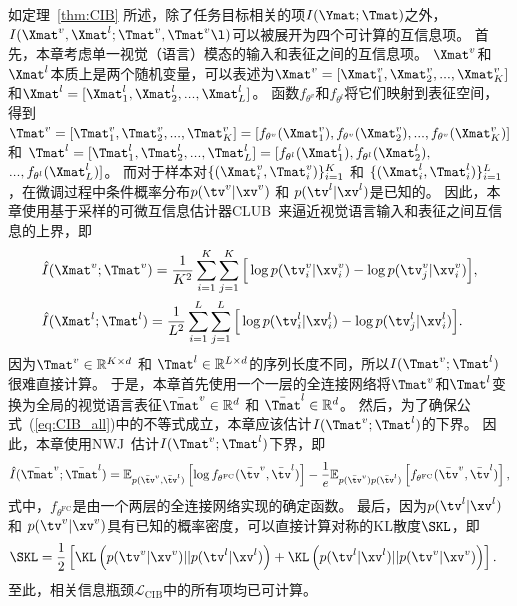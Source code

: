 如定理~\ref{thm:CIB} 所述，除了任务目标相关的项$I(\Ymat; \Tmat)$之外，$I(\Xmat^v, \Xmat^l; \Tmat^v, \Tmat^v\l)$可以被展开为四个可计算的互信息项。
首先，本章考虑单一视觉（语言）模态的输入和表征之间的互信息项。
$\Xmat^v$和$\Xmat^l$本质上是两个随机变量，可以表述为$\Xmat^v = [\Xmat^v_{1}, \Xmat^v_{2}, ..., \Xmat^v_{K}]$和$\Xmat^l = [\Xmat^l_{1}, \Xmat^l_{2}, ..., \Xmat^l_{L}]$。
函数$f_{\theta^v}$和$f_{\theta^l}$将它们映射到表征空间，得到$\Tmat^v = [\Tmat^v_{1}, \Tmat^v_{2}, ..., \Tmat^v_{K}] = [f_{\theta^v}(\Xmat^v_{1}), f_{\theta^v}(\Xmat^v_{2}), ..., f_{\theta^v}(\Xmat^v_{K})]$ 和 $\Tmat^l = [\Tmat^l_{1}, \Tmat^l_{2}, ..., \Tmat^l_{L}] = [f_{\theta^l}(\Xmat^l_{1}), f_{\theta^l}(\Xmat^l_{2}),$ $..., f_{\theta^l}(\Xmat^l_{L})]$。
而对于样本对$\{(\Xmat_i^v, \Tmat_i^v)\}_{i=1}^{K}$ 和 $\{(\Xmat_i^l, \Tmat_i^l)\}_{i=1}^{L}$，在微调过程中条件概率分布$p(\tv^v|\xv^v)$ 和 $p(\tv^l|\xv^l)$是已知的。
因此，本章使用基于采样的可微互信息估计器CLUB~\cite{cheng2020club}来逼近视觉语言输入和表征之间互信息的上界，即
\begin{align}
&\hat{I}(\Xmat^v; \Tmat^v) = \frac{1}{K^2} \sum_{i=1}^{K}\sum_{j=1}^{K} \Big[\log p(\tv_i^v|\xv_i^v) - \log p(\tv_j^v|\xv_i^v)\Big], \\ 
&\hat{I}(\Xmat^l; \Tmat^l) = \frac{1}{L^2} \sum_{i=1}^{L}\sum_{j=1}^{L} \Big[\log p(\tv_i^l|\xv_i^l) - \log p(\tv_j^l|\xv_i^l)\Big]. 
\label{eq:IB_sum_term}
\end{align} 
因为$\Tmat^v \in \mathbb{R}^{K\times d}$ 和 $\Tmat^l\in \mathbb{R}^{L\times d}$的序列长度不同，所以$I(\Tmat^v; \Tmat^l)$很难直接计算。
于是，本章首先使用一个一层的全连接网络将$\Tmat^v$和$\Tmat^l$变换为全局的视觉语言表征$\bar{\Tmat}^v \in \mathbb{R}^{d}$ 和 $\bar{\Tmat}^l\in \mathbb{R}^{d}$。
然后，为了确保公式~(\ref{eq:CIB_all})中的不等式成立，本章应该估计$I(\Tmat^v; \Tmat^l)$的下界。
因此，本章使用NWJ~\cite{poole2019variational}估计$I(\Tmat^v; \Tmat^l)$下界，即
\begin{equation} 
\begin{aligned} 
\hat{I}(\bar{\Tmat}^v; \bar{\Tmat}^l) = \mathbb{E}_{p(\bar{\tv}^v, \bar{\tv}^l)}\left[\log f_{\theta^{\text{FC}}}(\bar{\tv}^v, \bar{\tv}^l)\right] - \frac{1}{e}\mathbb{E}_{p(\bar{\tv}^v) p(\bar{\tv}^l)} \left[f_{\theta^{\text{FC}}}(\bar{\tv}^v, \bar{\tv}^l)\right],
\label{eq:IB_sum_term_rep}
\end{aligned} 
\end{equation} 
式中，$f_{\theta^{\text{FC}}}$是由一个两层的全连接网络实现的确定函数。
最后，因为$p(\tv^l|\xv^l)$ 和 $p(\tv^v|\xv^v)$具有已知的概率密度，可以直接计算对称的KL散度$\SKL$，即
\begin{align} 
&\SKL = \frac{1}{2} \left[\KL\left(p(\tv^v|\xv^v)||p(\tv^l|\xv^l)\right) + \KL\left(p(\tv^l|\xv^l)||p(\tv^v|\xv^v)\right)\right]. 
\label{eq:dskl}
\end{align} 
至此，相关信息瓶颈$\mathcal{L}_{\text{CIB}}$中的所有项均已可计算。


